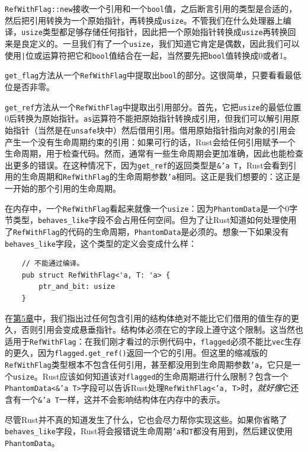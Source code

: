 \texttt{RefWithFlag::new}接收一个引用和一个\texttt{bool}值，之后断言引用的类型是合适的，然后把引用转换为一个原始指针，再转换成\texttt{usize}。不管我们在什么处理器上编译，\texttt{usize}类型都足够存储任何指针，因此把一个原始指针转换成\texttt{usize}再转换回来是良定义的。一旦我们有了一个\texttt{usize}，我们知道它肯定是偶数，因此我们可以使用\texttt{|}位或运算符把它和\texttt{bool}值结合在一起，当然要先把\texttt{bool}值转换成0或者1。

\texttt{get\_flag}方法从一个\texttt{RefWithFlag}中提取出\texttt{bool}的部分。这很简单，只要看看最低位是否非零。

\texttt{get\_ref}方法从一个\texttt{RefWithFlag}中提取出引用部分。首先，它把\texttt{usize}的最低位置0后转换为原始指针。\texttt{as}运算符不能把原始指针转换成引用，但我们可以解引用原始指针（当然是在\texttt{unsafe}块中）然后借用引用。借用原始指针指向对象的引用会产生一个没有生命周期约束的引用：如果可行的话，Rust会给任何引用赋予一个生命周期，用于检查代码。然而，通常有一些生命周期会更加准确，因此也能检查出更多的错误。在这种情况下，因为\texttt{get\_ref}的返回类型是\texttt{\&'a T}，Rust会看到引用的生命周期和\texttt{RefWithFlag}的生命周期参数\texttt{'a}相同。这正是我们想要的：这正是一开始的那个引用的生命周期。

在内存中，一个\texttt{RefWithFlag}看起来就像一个\texttt{usize}：因为\texttt{PhantomData}是一个0字节类型，\texttt{behaves\_like}字段不会占用任何空间。但为了让Rust知道如何处理使用了\texttt{RefWithFlag}的代码的生命周期，\texttt{PhantomData}是必须的。想象一下如果没有\texttt{behaves\_like}字段，这个类型的定义会变成什么样：
\begin{verbatim}
    // 不能通过编译。
    pub struct RefWithFlag<'a, T: 'a> {
        ptr_and_bit: usize
    }
\end{verbatim}

在\hyperref[ch05]{第5章}中，我们指出过任何包含引用的结构体绝对不能比它们借用的值生存的更久，否则引用会变成悬垂指针。结构体必须在它的字段上遵守这个限制。这当然也适用于\texttt{RefWithFlag}：在我们刚才看过的示例代码中，\texttt{flagged}必须不能比\texttt{vec}生存的更久，因为\texttt{flagged.get\_ref()}返回一个它的引用。但这里的缩减版的\texttt{RefWithFlag}类型根本不包含任何引用，甚至都没用到生命周期参数\texttt{'a}，它只是一个\texttt{usize}。Rust应该如何知道该对\texttt{flagged}的生命周期进行什么限制？包含一个\texttt{PhantomData<\&'a T>}字段可以告诉Rust处理\texttt{RefWithFlag<'a, T>}时，\emph{就好像}它还含有一个\texttt{\&'a T}一样，这并不会影响结构体在内存中的表示。

尽管Rust并不真的知道发生了什么，它也会尽力帮你实现这些。如果你省略了\\
\texttt{behaves\_like}字段，Rust将会报错说生命周期\texttt{'a}和\texttt{T}都没有用到，然后建议使用\texttt{PhantomData}。

